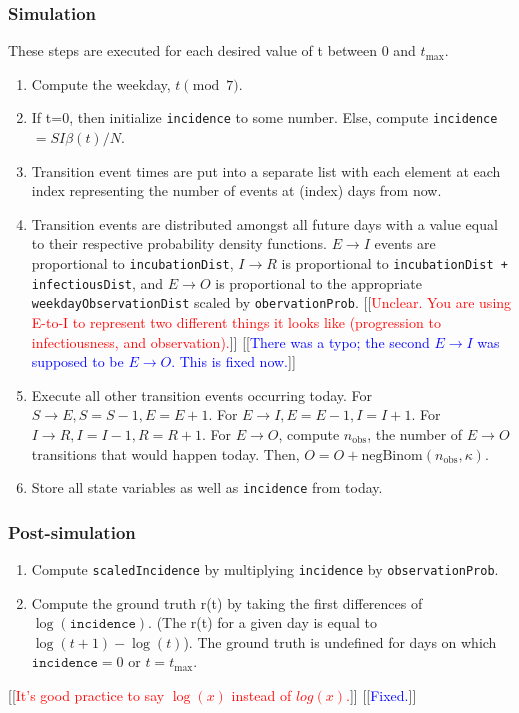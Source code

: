 \documentclass{article}
\newcommand{\code}[1]{\texttt{#1}}
\newcommand{\jd}[1]{[[\textcolor{red}{#1}]]}  \newcommand{\msComment}[1]{[[\textcolor{blue}{#1}]]}
\newcommand{\jd}[1]{} \newcommand{\msComment}[1]{}
\begin{document}
\subsubsection{Simulation}
These steps are executed for each desired value of t between 0 and $t_{\mathrm{max}}$.
\begin{enumerate}
    
    \item Compute the weekday, $t \pmod 7$.
    
    \item If t=0, then initialize \code{incidence} to some number. Else, compute \code{incidence} $= SI\beta(t)/N$.
    
    \item Transition event times are put into a separate list with each element at each index representing the number of events at (index) days from now. 

    \item Transition events are distributed amongst all future days with a value equal to their respective probability density functions. $E \rightarrow I$ events are proportional to \code{incubationDist}, $I \rightarrow R$ is proportional to \code{incubationDist + infectiousDist}, and $E \rightarrow O$ is proportional to the appropriate \linebreak \code{weekdayObservationDist} scaled by \code{obervationProb}.
	 \jd{Unclear. You are using E-to-I to represent two different things it looks like (progression to infectiousness, and observation).} \msComment{There was a typo; the second $E \rightarrow I$ was supposed to be $E \rightarrow O$. This is fixed now.}

    \item Execute all other transition events occurring today. For $S \rightarrow E, S=S-1, E=E+1$. For $E \rightarrow I, E=E-1, I=I+1$. For $I \rightarrow R, I = I-1, R = R+1$. For $E \rightarrow O$, compute $n_{\mathrm{obs}}$, the number of $E \rightarrow O$ transitions that would happen today. Then, $O = O + \mathrm{negBinom}(n_{\mathrm{obs}}, \kappa)$.    
    
    \item Store all state variables as well as \code{incidence} from today.
    
\end{enumerate}

\subsubsection{Post-simulation}
\begin{enumerate}
    \item Compute \code{scaledIncidence} by multiplying \code{incidence} by \code{observationProb}.
    \item Compute the ground truth r(t) by taking the first differences of $\log(\code{incidence})$. (The r(t) for a given day is equal to $\log(t+1) - \log(t)$). The ground truth is undefined for days on which $\code{incidence}=0$ or $t=t_{\mathrm{max}}$. 
\end{enumerate}
\jd{It's good practice to say $\log(x)$ instead of $log(x)$.} \msComment{Fixed.}
\end{document}
